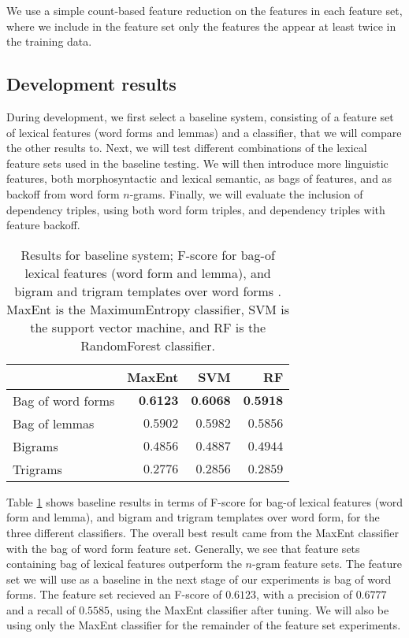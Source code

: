 \documentclass[11pt,letterpaper]{article}
\begin{document}
We use a simple count-based feature reduction on the features in each feature set, where we include in the feature set only the features the appear at least twice in the training data.


\subsection{Development results}

During development, we first select a baseline system, consisting of a feature set of lexical features (word forms and lemmas) and a classifier, that we will compare the other results to. Next, we will test different combinations of the lexical feature sets used in the baseline testing. We will then introduce more linguistic features, both morphosyntactic and lexical semantic, as bags of features, and as backoff from word form $n$-grams. Finally, we will evaluate the inclusion of dependency triples, using both word form triples, and dependency triples with feature backoff.

\begin{table}
  \begin{center}
    \begin{tabular}{lrrr}
      \toprule

      & MaxEnt & SVM & RF \\
      \midrule
      Bag of word forms & $\textbf{0.6123}$ & $\textbf{0.6068}$ & $\textbf{0.5918}$ \\ %
      Bag of lemmas & $0.5902$ & $0.5982$ & $0.5856$ \\
      Bigrams & $0.4856$ & $0.4887$ & $0.4944$ \\
      Trigrams & $0.2776$ & $0.2856$ & $0.2859$ \\
      
      
      \bottomrule
    \end{tabular}
  \end{center}
  \caption{Results for baseline system; F-score for bag-of lexical features (word form and lemma), and bigram and trigram templates over word forms . MaxEnt is the MaximumEntropy classifier, SVM is the support vector machine, and RF is the RandomForest classifier.}
  \label{tab:baseline}
\end{table}

Table \ref{tab:baseline} shows baseline results in terms of F-score for bag-of lexical features (word form and lemma), and bigram and trigram templates over word form, for the three different classifiers. The overall best result came from the MaxEnt classifier with the bag of word form feature set. Generally, we see that feature sets containing bag of lexical features outperform the $n$-gram feature sets. The feature set we will use as a baseline in the next stage of our experiments is bag of word forms. The feature set recieved an F-score of $0.6123$, with a precision of $0.6777$ and a recall of $0.5585$, using the MaxEnt classifier after tuning. We will also be using only the MaxEnt classifier for the remainder of the feature set experiments.
\end{document}
